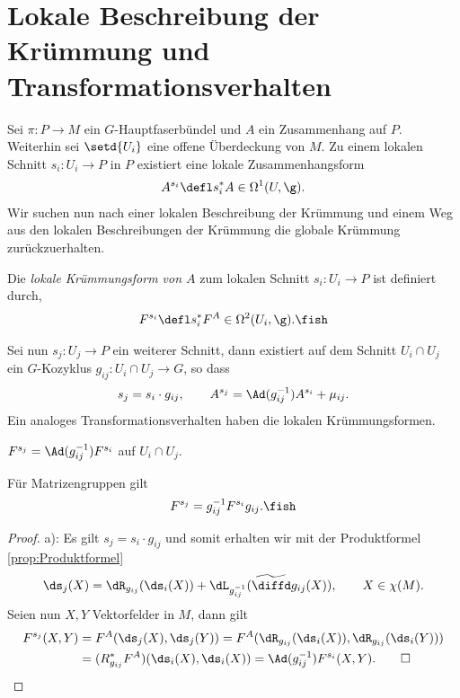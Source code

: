 \documentclass[%
	paper=a5,%
	fleqn,%
	DIV=18,%
	BCOR=0mm,
	fontsize=11pt,
	titlepage=false,%
	bibliography=totoc,
	DIV=18,%
	twoside=true,
	pdftitle=Riemannsche Geometrie,
	pdfauthor=Uwe Semmelmann,
	numbers=noendperiod]%
	{scrbook}
\begin{document}
\section{Lokale Beschreibung der Krümmung und Transformationsverhalten}

Sei $\pi: P\to M$ ein $G$-Hauptfaserbündel und $A$ ein Zusammenhang auf $P$.
Weiterhin sei $\setd{U_i}$ eine offene Überdeckung von $M$. Zu einem lokalen
Schnitt $s_i : U_i\to P$ in $P$ existiert eine lokale Zusammenhangsform
\begin{align*}
A^{s_i} \defl s_i^* A \in\Omega^1(U,\g).
\end{align*}
Wir suchen nun nach einer lokalen Beschreibung der Krümmung und einem Weg aus
den lokalen Beschreibungen der Krümmung die globale Krümmung zurückzuerhalten.

\begin{defn}
Die \emph{lokale Krümmungsform von $A$} zum lokalen Schnitt $s_i :U_i\to P$ ist
definiert durch,
\begin{align*}
F^{s_i} \defl s_i^* F^A \in \Omega^2(U_i,\g).\fish
\end{align*}
\end{defn}

Sei nun $s_j :U_j\to P$ ein weiterer Schnitt, dann existiert auf dem Schnitt $U_i\cap U_j$ ein $G$-Kozyklus
$g_{ij}: U_i\cap U_j\to G$, so dass
\begin{align*}
s_j = s_i\cdot g_{ij},\qquad A^{s_j} = \Ad(g_{ij}^{-1})A^{s_i} + \mu_{ij}.
\end{align*}
Ein analoges Transformationsverhalten haben die lokalen Krümmungsformen.

\begin{lem}
\begin{propenum}
\item $F^{s_j} = \Ad(g_{ij}^{-1})F^{s_i}$ auf $U_i\cap U_j$.
\item Für Matrizengruppen gilt
\begin{align*}
F^{s_j} = g_{ij}^{-1}F^{s_i}g_{ij}.\fish
\end{align*}
\end{propenum}
\end{lem}
\begin{proof}
a): Es gilt $s_j = s_i\cdot g_{ij}$ und somit erhalten wir mit der Produktformel
\ref{prop:Produktformel}
\begin{align*}
\ds_j(X) = \dR_{g_{ij}}(\ds_i(X)) + \widetilde{\dL_{g_{ij}^{-1}}(\diffd
g_{ij}(X))},\qquad X\in\chi(M).
\end{align*}
Seien nun $X,Y$ Vektorfelder in $M$, dann gilt
\begin{align*}
F^{s_j}(X,Y) &= F^A(\ds_j(X),\ds_j(Y))
= F^A(\dR_{g_{ij}}(\ds_i(X)),\dR_{g_{ij}}(\ds_i(Y)))\\
&= (R_{g_{ij}}^* F^A)(\ds_i(X),\ds_i(X)) =
\Ad(g_{ij}^{-1})F^{s_i}(X,Y).\qed
\end{align*}
\end{proof}
\end{document}
